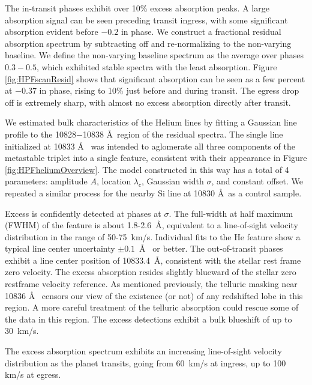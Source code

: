 \documentclass[twocolumn]{aastex631}
\begin{document}
The in-transit phases exhibit over 10\% excess absorption peaks.  A large absorption signal can be seen preceding transit ingress, with some significant absorption evident before $-0.2$ in phase.  We construct a fractional residual absorption spectrum by subtracting off and re-normalizing to the non-varying baseline.  We define the non-varying baseline spectrum as the average over phases $0.3-0.5$, which exhibited stable spectra with the least absorption.  Figure \ref{fig:HPFscanResid} shows that significant absorption can be seen as a few percent at $-0.37$ in phase, rising to 10\% just before and during transit.  The egress drop off is extremely sharp, with almost no excess absorption directly after transit.


We estimated bulk characteristics of the Helium lines by fitting a Gaussian line profile to the 10828$-$10838 \AA~region of the residual spectra.  The single line initialized at 10833 \AA~ was intended to aglomerate all three components of the metastable triplet into a single feature, consistent with their appearance in Figure \ref{fig:HPFheliumOverview}.  The model constructed in this way has a total of 4 parameters: amplitude $A$, location $\lambda_c$, Gaussian width $\sigma$, and constant offset.  We repeated a similar process for the nearby Si line at 10830 \AA~as a control sample.

Excess is confidently detected at  phases at $\sigma$.  The full-width at half maximum (FWHM) of the feature is about 1.8-2.6~\AA, equivalent to a line-of-sight velocity distribution in the range of 50-75~km/s.  Individual fits to the He feature show a typical line center uncertainty $\pm0.1$~\AA~ or better.  The out-of-transit phases exhibit a line center position of 10833.4~\AA, consistent with the stellar  rest frame zero velocity.  The excess absorption resides slightly blueward of the stellar zero restframe velocity reference.  As mentioned previously, the telluric masking near 10836 \AA~ censors our view of the existence (or not) of any redshifted lobe in this region.  A more careful treatment of the telluric absorption could rescue some of the data in this region.  The excess detections exhibit a bulk blueshift of up to 30~km/s.

The excess absorption spectrum exhibits an increasing line-of-sight velocity distribution as the planet transits, going from 60~km/s at ingress, up to 100 km/s at egress.
\end{document}
